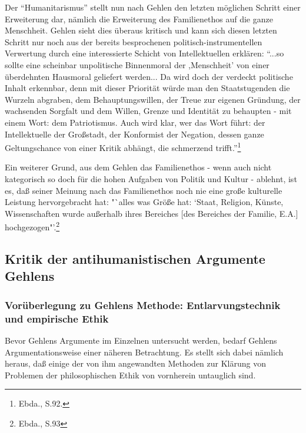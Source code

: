 \documentclass[12pt,a4paper]{article}
\begin{document}
Der "`Humanitarismus"' stellt nun nach Gehlen den letzten möglichen Schritt
einer Erweiterung dar, nämlich die Erweiterung des Familienethos auf die
ganze Menschheit. Gehlen sieht dies überaus kritisch und kann sich diesen
letzten Schritt nur noch aus der bereits besprochenen
politisch-instrumentellen Verwertung durch eine interessierte Schicht von
Intellektuellen erklären: "`...so sollte eine scheinbar unpolitische
Binnenmoral der ,Menschheit' von einer überdehnten Hausmoral geliefert
werden... Da wird doch der verdeckt politische Inhalt erkennbar, denn mit
dieser Priorität würde man den Staatstugenden die Wurzeln abgraben, dem
Behauptungswillen, der Treue zur eigenen Gründung, der wachsenden Sorgfalt
und dem Willen, Grenze und Identität zu behaupten - mit einem Wort: dem
Patriotismus. Auch wird klar, wer das Wort führt: der Intellektuelle der
Großstadt, der Konformist der Negation, dessen ganze Geltungschance von
einer Kritik abhängt, die schmerzend trifft."'\footnote{Ebda., S.92.}

Ein weiterer Grund, aus dem Gehlen das Familienethos - wenn auch nicht
kategorisch so doch für die hohen Aufgaben von Politik und Kultur - ablehnt,
ist es, daß seiner Meinung nach das Familienethos noch nie eine große
kulturelle Leistung hervorgebracht hat: "`alles was Größe hat: `Staat,
Religion, Künste, Wissenschaften wurde außerhalb ihres Bereiches [des
Bereiches der Familie, E.A.] hochgezogen"'.\footnote{Ebda., S.93}

\subsection{Kritik der antihumanistischen Argumente Gehlens}

\subsubsection{Vorüberlegung zu Gehlens Methode: Entlarvungstechnik und empirische Ethik}

Bevor Gehlens Argumente im Einzelnen untersucht werden, bedarf Gehlens
Argumentationsweise einer näheren Betrachtung. Es stellt sich dabei
nämlich heraus, daß einige der von ihm angewandten Methoden zur Klärung
von Problemen der philosophischen Ethik von vornherein untauglich sind.
\end{document}
